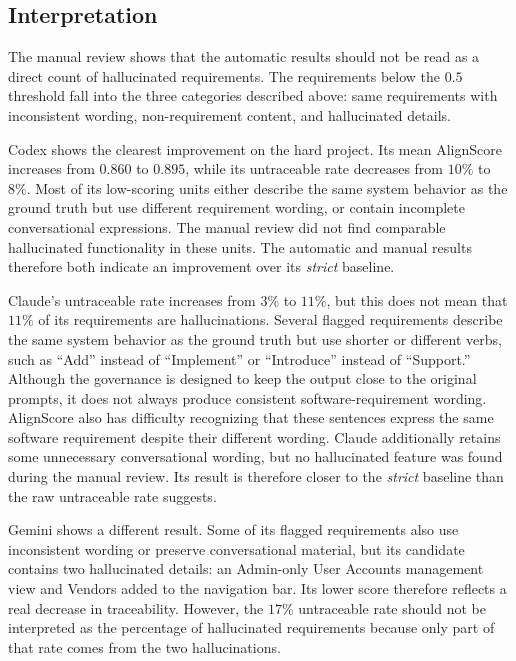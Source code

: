 \subsection{Interpretation}

The manual review shows that the automatic results should not be read as a
direct count of hallucinated requirements. The requirements below the $0.5$
threshold fall into the three categories described above: same requirements
with inconsistent wording, non-requirement content, and hallucinated
details.

Codex shows the clearest improvement on the hard project. Its mean AlignScore
increases from $0.860$ to $0.895$, while its untraceable rate decreases from
$10\%$ to $8\%$. Most of its low-scoring units either describe the same
system behavior as the ground truth but use different requirement wording, or
contain incomplete conversational expressions. The manual review did not find
comparable hallucinated functionality in these units. The automatic and manual
results therefore both indicate an improvement over its \emph{strict}
baseline.

Claude's untraceable rate increases from $3\%$ to $11\%$, but this does not
mean that $11\%$ of its requirements are hallucinations. Several flagged
requirements describe the same system behavior as the ground truth but use
shorter or different verbs, such as ``Add'' instead of ``Implement'' or
``Introduce'' instead of ``Support.'' Although the governance is designed to
keep the output close to the original prompts, it does not always produce
consistent software-requirement wording. AlignScore also has difficulty
recognizing that these sentences express the same software requirement
despite their different wording. Claude additionally retains some unnecessary
conversational wording, but no hallucinated feature was found during the
manual review. Its result is therefore closer to the \emph{strict} baseline
than the raw untraceable rate suggests.

Gemini shows a different result. Some of its flagged requirements also use
inconsistent wording or preserve conversational material, but its candidate
contains two hallucinated details: an Admin-only User Accounts management view
and Vendors added to the navigation bar. Its lower score therefore reflects a
real decrease in traceability. However, the $17\%$ untraceable rate should not
be interpreted as the percentage of hallucinated requirements because only
part of that rate comes from the two hallucinations.

